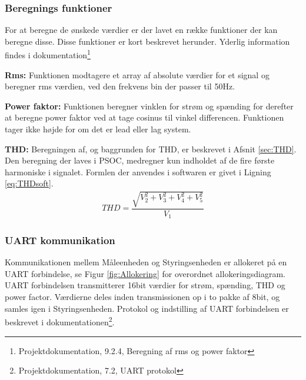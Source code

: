 
\subsubsection{Beregnings funktioner}
For at beregne de ønskede værdier er der lavet en række funktioner der kan beregne disse. Disse funktioner er kort beskrevet herunder. Yderlig information findes i dokumentation\footnote{Projektdokumentation, 9.2.4, Beregning af rms og power faktor}

\textbf{Rms:}
Funktionen modtagere et array af absolute værdier for et signal og beregner rms værdien, ved den frekvens bin der passer til 50Hz.

\textbf{Power faktor:}
Funktionen beregner vinklen for strøm og spænding for derefter at beregne power faktor ved at tage cosinus til vinkel differencen. Funktionen tager ikke højde for om det er lead eller lag system.

\textbf{THD:}
Beregningen af, og baggrunden for THD, er beskrevet i Afsnit \ref{sec:THD}. Den beregning der laves i PSOC, medregner kun indholdet af de fire første harmoniske i signalet. Formlen der anvendes i softwaren er givet i Ligning \ref{eq:THDsoft}.
\begin{align}
\label{eq:THDsoft}
THD = \dfrac{\sqrt{V_2^{2}+V_3^{2}+V_4^{2}+V_5^{2}}}{V_{1}}
\end{align}
 

\subsubsection{UART kommunikation}
Kommunikationen mellem Måleenheden og Styringsenheden er allokeret på en UART forbindelse, se Figur \ref{fig:Allokering} for overordnet allokeringsdiagram. UART forbindelsen transmitterer 16bit værdier for strøm, spænding, THD og power factor. Værdierne deles inden transmissionen op i to pakke af 8bit, og samles igen i Styringsenheden. Protokol og indstilling af UART forbindelsen er beskrevet i dokumentationen\footnote{Projektdokumentation, 7.2, UART protokol}.




